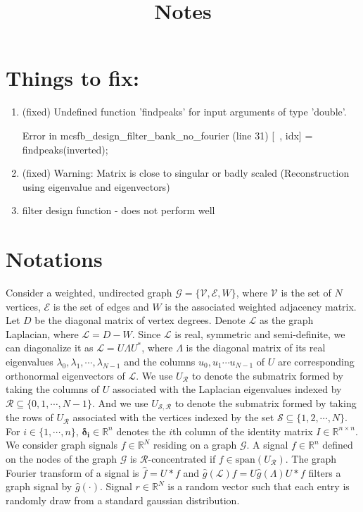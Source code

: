 \documentclass[a4paper]{article}
\title{Notes}
\newcommand{\R}{\mathcal{R}}
\newcommand{\RR}{\mathbb{R}}
\newcommand{\G}{\mathcal{G}}
\newcommand{\V}{\mathcal{V}}
\newcommand{\E}{\mathcal{E}}
\newcommand{\La}{\mathcal{L}}
\newcommand{\UR}{U_{\mathcal{R}}}
\theoremstyle{definition}
\begin{document}
\maketitle

\newpage


\section{Things to fix:}
\begin{enumerate}
\item (fixed) Undefined function 'findpeaks' for input
arguments of type 'double'.

Error in mcsfb\_design\_filter\_bank\_no\_fourier
(line 31)
    [~, idx] = findpeaks(inverted); 
    
\item (fixed) Warning: Matrix is close to singular or badly scaled (Reconstruction using eigenvalue and eigenvectors)


\item filter design function - does not perform well

\end{enumerate}

\section{Notations}
Consider a weighted, undirected graph $\G = \{ \V, \E, W\}$, where $\V$ is the set of $N$ vertices, $\E$ is the set of edges and $W$ is the associated weighted adjacency matrix. Let $D$ be the diagonal matrix of vertex degrees. Denote $\La$ as the graph Laplacian, where $\La = D-W$. Since $\La$ is real, symmetric and semi-definite, we can diagonalize it as $\La =U\Lambda U^*$, where $\Lambda$ is the diagonal matrix of its real eigenvalues $\lambda_0, \lambda_1,\cdots, \lambda_{N-1}$ and the columns $u_0, u_1 \cdots u_{N-1}$ of $U$ are corresponding orthonormal eigenvectors of $\La$. We use $\UR$ to denote the submatrix formed by taking the columns of $U$ associated with the Laplacian eigenvalues indexed by $\mathcal{R} \subseteq \{0,1,\cdots,N-1\}$. And we use $U_{\mathcal{S},\mathcal{R}}$ to denote the submatrix formed by taking the rows of $U_{\mathcal{R}}$ associated with the vertices indexed by the set $\mathcal{S} \subseteq \{1,2,\cdots, N\}$. For $i \in \{1,\cdots,n\}$, $\bm{\delta_i} \in \RR^n$ denotes the $i$th column of the identity matrix $I \in \RR^{n\times n}.$
We consider graph signals $f \in \RR^N$ residing on a graph $\G$. A signal $f \in \RR^n$ defined on the nodes of the graph $\G$ is $\R$-concentrated if $f \in \text{span}(U_{\R})$. The graph Fourier transform of a signal is $\hat{f} = U*f$ and $\hat{g}(\La) f = U\hat{g}(\Lambda)U*f$ filters a graph signal by $\hat{g}(\cdot)$. Signal $r\in \RR^N$ is a random vector such that each entry is randomly draw from a standard gaussian distribution.
\end{document}
